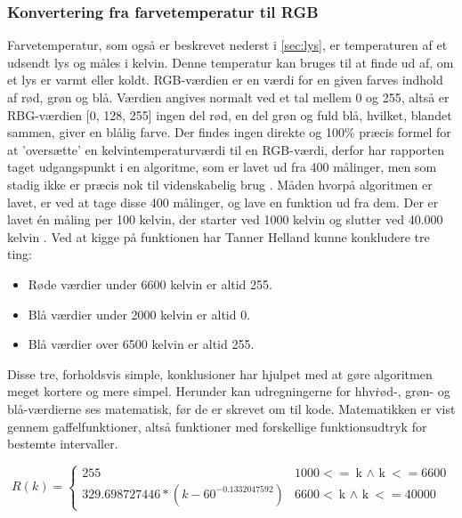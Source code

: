 \subsubsection{Konvertering fra farvetemperatur til RGB}
\label{sec:temptilrgb}
Farvetemperatur, som også er beskrevet nederst i \ref{sec:lys}, er temperaturen af et udsendt lys og måles i kelvin. Denne temperatur kan bruges til at finde ud af, om et lys er varmt eller koldt. 
RGB-værdien er en værdi for en given farves indhold af rød, grøn og blå. Værdien angives normalt ved et tal mellem 0 og 255, altså er RBG-værdien [0, 128, 255] ingen del rød, en del grøn og fuld blå, hvilket, blandet sammen, giver en blålig farve.
Der findes ingen direkte og 100\% præcis formel for at ’oversætte’ en kelvintemperaturværdi til en RGB-værdi, derfor har rapporten taget udgangspunkt i en algoritme, som er lavet ud fra 400 målinger, men som stadig ikke er præcis nok til videnskabelig brug \cite{tanner_helland}.
Måden hvorpå algoritmen er lavet, er ved at tage disse 400 målinger, og lave en funktion ud fra dem. Der er lavet én måling per 100 kelvin, der starter ved 1000 kelvin og slutter ved 40.000 kelvin \cite{charity_values}. Ved at kigge på funktionen \cite{tanner_helland_chart} har Tanner Helland kunne konkludere  tre ting:

\begin{itemize}
\item Røde værdier under 6600 kelvin er altid 255.
\item Blå værdier under 2000 kelvin er altid 0.
\item Blå værdier over 6500 kelvin er altid 255.
\end{itemize}

Disse tre, forholdsvis simple, konklusioner har hjulpet med at gøre algoritmen meget kortere og mere simpel. Herunder kan udregningerne for hhv\.  rød-, grøn- og blå-værdierne ses matematisk, før de er skrevet om til kode. Matematikken er vist gennem gaffelfunktioner, altså funktioner med forskellige funktionsudtryk for bestemte intervaller.


\begin{displaymath}
   R(k) = \left\{
     \begin{array}{lr}
       255 &1000 <= \text{k $\land$ k} <= 6600\\
       329.698727446*(k-60^{-0.1332047592}) &6600 < \text{k $\land$ k} <= 40000
     \end{array}
   \right.
\end{displaymath} 

